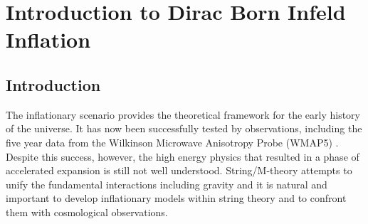 \renewcommand{\CVSrevision}{\version$Id: dbi-intro.tex,v 1.22 2009/08/01 22:13:18 ith Exp $}
\chapter{Introduction to Dirac Born Infeld Inflation}
\label{ch:dbi-intro}

\section{Introduction}
% 
\label{sec:dbi-intro}


The inflationary scenario provides the 
theoretical framework for the early history 
of the universe. It has now been successfully tested by observations, 
including the five year data from the Wilkinson Microwave Anisotropy 
Probe (WMAP5) \cite{Komatsu:2008hk}. Despite this success, however, the high energy 
physics that resulted in a phase of accelerated expansion is still 
not well understood. String/M-theory attempts to unify the fundamental interactions 
including gravity and it is natural and important to 
develop inflationary models within string theory and to confront them with 
cosmological observations. 
 

